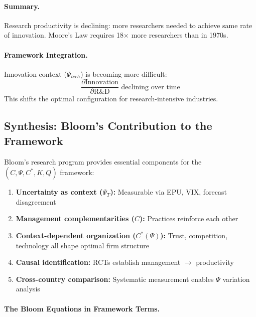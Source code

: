 \documentclass[12pt,a4paper]{article}
\begin{document}
\paragraph{Summary.}
Research productivity is declining: more researchers needed to achieve same rate of
innovation. Moore's Law requires 18$\times$ more researchers than in 1970s.

\paragraph{Framework Integration.}
Innovation context ($\Psi_{tech}$) is becoming more difficult:
\begin{equation}
  \frac{\partial \text{Innovation}}{\partial \text{R\&D}} \text{ declining over time}
\end{equation}
This shifts the optimal configuration for research-intensive industries.

\subsection{Synthesis: Bloom's Contribution to the Framework}

Bloom's research program provides essential components for the $(C, \Psi, C^*, K, Q)$ framework:

\begin{enumerate}
  \item \textbf{Uncertainty as context ($\Psi_T$):} Measurable via EPU, VIX, forecast disagreement
  \item \textbf{Management complementarities ($C$):} Practices reinforce each other
  \item \textbf{Context-dependent organization ($C^*(\Psi)$):} Trust, competition, technology
        all shape optimal firm structure
  \item \textbf{Causal identification:} RCTs establish management $\rightarrow$ productivity
  \item \textbf{Cross-country comparison:} Systematic measurement enables $\Psi$ variation analysis
\end{enumerate}

\paragraph{The Bloom Equations in Framework Terms.}
\end{document}
